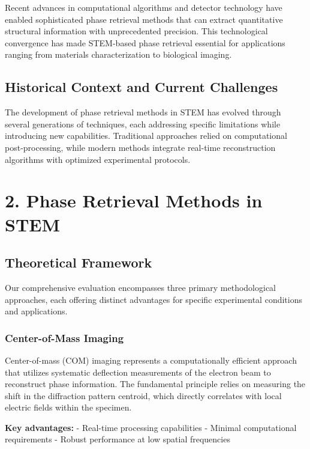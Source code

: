 \documentclass[
  letterpaper,
]{book}
\begin{document}
Recent advances in computational algorithms and detector technology have
enabled sophisticated phase retrieval methods that can extract
quantitative structural information with unprecedented precision. This
technological convergence has made STEM-based phase retrieval essential
for applications ranging from materials characterization to biological
imaging.

\section{Historical Context and Current
Challenges}\label{historical-context-and-current-challenges}

The development of phase retrieval methods in STEM has evolved through
several generations of techniques, each addressing specific limitations
while introducing new capabilities. Traditional approaches relied on
computational post-processing, while modern methods integrate real-time
reconstruction algorithms with optimized experimental protocols.


\chapter{2. Phase Retrieval Methods in
STEM}\label{phase-retrieval-methods-in-stem}

\section{Theoretical Framework}\label{theoretical-framework}

Our comprehensive evaluation encompasses three primary methodological
approaches, each offering distinct advantages for specific experimental
conditions and applications.

\subsection{Center-of-Mass Imaging}\label{center-of-mass-imaging}

Center-of-mass (COM) imaging represents a computationally efficient
approach that utilizes systematic deflection measurements of the
electron beam to reconstruct phase information. The fundamental
principle relies on measuring the shift in the diffraction pattern
centroid, which directly correlates with local electric fields within
the specimen.

\textbf{Key advantages:} - Real-time processing capabilities - Minimal
computational requirements - Robust performance at low spatial
frequencies
\end{document}
